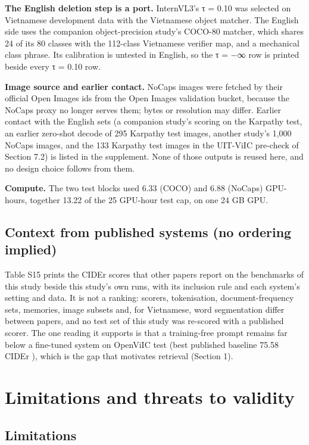 \documentclass[manuscript,screen]{acmart}
\begin{document}
\textbf{The English deletion step is a port.} InternVL3's τ = 0.10 was selected on Vietnamese
development data with the Vietnamese object matcher. The English side uses the companion
object-precision study's COCO-80 matcher, which shares 24 of its 80 classes with the 112-class
Vietnamese verifier map, and a mechanical class phrase. Its calibration is untested in English, so
the τ = −∞ row is printed beside every τ = 0.10 row.

\textbf{Image source and earlier contact.} NoCaps images were fetched by their official Open Images
ids from the Open Images validation bucket, because the NoCaps proxy no longer serves them; bytes or
resolution may differ. Earlier contact with the English sets (a companion study's scoring on the
Karpathy test, an earlier zero-shot decode of 295 Karpathy test images, another study's 1,000 NoCaps
images, and the 133 Karpathy test images in the UIT-ViIC pre-check of Section 7.2) is listed in the
supplement. None of those outputs is reused here, and no design choice follows from them.

\textbf{Compute.} The two test blocks used 6.33 (COCO) and 6.88 (NoCaps) GPU-hours, together 13.22
of the 25 GPU-hour test cap, on one 24 GB GPU.

\subsection{Context from published systems (no ordering
implied)}\label{context-from-published-systems-no-ordering-implied}

Table S15 prints the CIDEr scores that other papers report on the benchmarks of this study beside
this study's own runs, with its inclusion rule and each system's setting and data. It is not a
ranking: scorers, tokenisation, document-frequency sets, memories, image subsets and, for
Vietnamese, word segmentation differ between papers, and no test set of this study was re-scored
with a published scorer. The one reading it supports is that a training-free prompt remains far
below a fine-tuned system on OpenViIC test (best published baseline 75.58 CIDEr
\citep{Bui2023OpenViIC}), which is the gap that motivates retrieval (Section 1).

\section{Limitations and threats to validity}\label{limitations-and-threats-to-validity}

\subsection{Limitations}\label{limitations}
\end{document}

